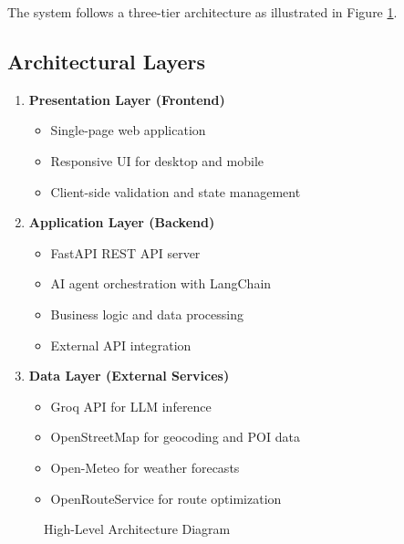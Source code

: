 \documentclass[12pt,a4paper]{report}
\begin{document}
The system follows a three-tier architecture as illustrated in Figure \ref{fig:high-level-arch}.

\subsection{Architectural Layers}

\begin{enumerate}[leftmargin=*]
    \item \textbf{Presentation Layer (Frontend)}
    \begin{itemize}
        \item Single-page web application
        \item Responsive UI for desktop and mobile
        \item Client-side validation and state management
    \end{itemize}
    
    \item \textbf{Application Layer (Backend)}
    \begin{itemize}
        \item FastAPI REST API server
        \item AI agent orchestration with LangChain
        \item Business logic and data processing
        \item External API integration
    \end{itemize}
    
    \item \textbf{Data Layer (External Services)}
    \begin{itemize}
        \item Groq API for LLM inference
        \item OpenStreetMap for geocoding and POI data
        \item Open-Meteo for weather forecasts
        \item OpenRouteService for route optimization
    \end{itemize}
\end{enumerate}

\begin{figure}[H]
    \centering
    \caption{High-Level Architecture Diagram}
    \label{fig:high-level-arch}
\end{figure}
\end{document}
